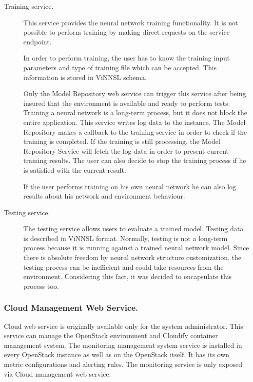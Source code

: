 \begin{description}
\item[Training service.]  This service provides the neural network training functionality. It is not possible to perform training by making direct requests on the service endpoint. 

In order to perform training, the user has to know the training input parameters and type of training file which can be accepted. This information is stored in ViNNSL schema. 
 
Only the Model Repository web service can trigger this service after being insured that the environment is available and ready to perform tests. Training a neural network is a long-term process, but it does not block the entire application. This service writes log data to the instance. The Model Repository makes a callback to the training service in order to check if the training is completed. If the training is still processing, the Model Repository Service will fetch the log data in order to present current training results. The user can also decide to stop the training process if he is satisfied with the current result.

If the user performs training on his own neural network he can also log results about his network and environment behaviour. 
\item[Testing service.] The testing service allows users to evaluate a trained model. Testing data is described in ViNNSL format. Normally, testing is not a long-term process because it is running against a trained neural network model. Since there is absolute freedom by neural network structure customization, the testing process can be inefficient and could take resources from the environment. Considering this fact, it was decided to encapsulate this process too. 
\end{description}

\subsubsection{Cloud Management Web Service.}\label{Cloud management Web Service}  Cloud web service is originally available only for the system administrator. This service can manage the OpenStack environment and Cloudify container management system. The monitoring management system service is installed in every OpenStack instance as well as on the OpenStack itself. It has its own metric configurations and alerting rules. The monitoring service is only exposed via Cloud management web service. 
 
